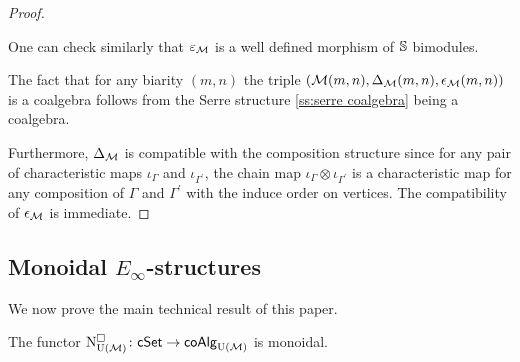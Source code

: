 \begin{proof}
\begin{center}
		\qquad
	\end{center}	
	One can check similarly that $\varepsilon_\M$ is a well defined morphism of $\S$ bimodules.
	
	The fact that for any biarity $(m,n)$ the triple $(\M(m,n), \Delta_\M(m,n), \epsilon_\M(m,n))$ is a coalgebra follows from the Serre structure \cref{ss:serre coalgebra} being a coalgebra.
	
	Furthermore, $\Delta_\M$ is compatible with the composition structure since for any pair of characteristic maps $\iota_\Gamma$ and $\iota_{\Gamma^\prime}$, the chain map $\iota_\Gamma \otimes \iota_{\Gamma^\prime}$ is a characteristic map for any composition of $\Gamma$ and $\Gamma^\prime$ with the induce order on vertices.
	The compatibility of $\epsilon_\M$ is immediate.
\end{proof}

\subsection{Monoidal $E_{\infty}$-structures} 

We now prove the main technical result of this paper.

\begin{lemma} \label{l:cubical e-infty chains are monoidal}
	The functor $\cchainsUM \colon \cSet \to \coAlg_\UM$ is monoidal.
\end{lemma}

